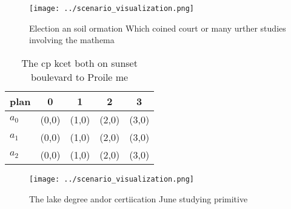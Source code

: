 \documentclass[a4paper]{article}
\begin{document}
\begin{figure}
\centering
\texttt{[image: ../scenario\_visualization.png]}
\caption{Election an soil ormation Which coined court or many urther studies involving the mathema
}
\end{figure}
 
\begin{table}
\begin{adjustbox}{width=0.6\columnwidth}
\begin{tabular}{|l|l|l|l|l|}
\hline
\textbf{plan} & \multicolumn{1}{c|}{\textbf{0}} & \multicolumn{1}{c|}{\textbf{1}} & \multicolumn{1}{c|}{\textbf{2}} & \multicolumn{1}{c|}{\textbf{3}} \\ \hline
\textbf{$a_0$}  & (0,0) & (1,0) & (2,0) & (3,0) \\ \hline
\textbf{$a_1$}  & (0,0) & (1,0) & (2,0) & (3,0) \\ \hline
\textbf{$a_2$}  & (0,0) & (1,0) & (2,0) & (3,0) \\ \hline
\end{tabular}
\end{adjustbox}
\caption{The cp kcet both on sunset boulevard to Proile me
}
\end{table}

\begin{figure}
\centering
\texttt{[image: ../scenario\_visualization.png]}
\caption{The lake degree andor certiication June studying primitive 
}
\end{figure}
 
\end{document}
